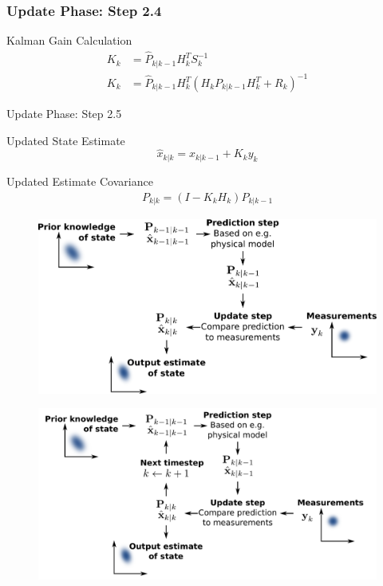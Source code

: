 \documentclass[aspectratio=169,hyperref={pdfpagelabels=false}]{beamer}
\begin{document}
\begin{frame}
\frametitle{Update Phase: Step 2.4}
    \begin{block}{Kalman Gain Calculation}
      \begin{align*}
        K_{k} &= \hat{P}_{k|k-1}H_{k}^T S_{k}^{-1} \\
        K_{k} &= \hat{P}_{k|k-1}H_{k}^T(H_{k}P_{k|k-1}H_{k}^T + R_{k})^{-1}
        \end{align*}        
    \end{block}

\end{frame}

\begin{frame}{Update Phase: Step 2.5}
  \begin{block}{Updated State Estimate}
    \[ \hat{x}_{k|k} = \hat{x}_{k|k-1} + K_{k}y_{k} \]
\end{block}
  \begin{block}{Updated Estimate Covariance}
    \begin{align*}
      P_{k|k} = (I - K_{k}H_{k})P_{k|k-1}
    \end{align*}
\end{block}
\end{frame}

\begin{frame}
  \begin{figure}
    \centering
    \includegraphics[width=1\linewidth]{img/5.pdf}
  \end{figure}
\end{frame}


\begin{frame}
  \begin{figure}
    \centering
    \includegraphics[width=1\linewidth]{img/Basic_concept_of_Kalman_filtering.pdf}
  \end{figure}
\end{frame}
\end{document}
